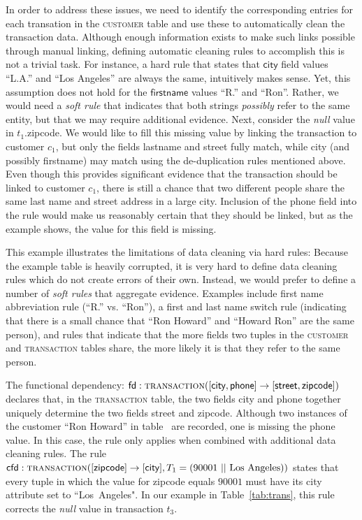 In order to address these issues, we need to identify the corresponding entries for each transation in the \textsc{customer} table and use these to automatically clean the transaction data. Although enough information exists to make such links possible through manual linking, defining automatic cleaning rules to accomplish this is not a trivial task. For instance, a hard rule that states that $\textsf{city}$ field values ``L.A.'' and ``Los Angeles'' are always the same, intuitively makes sense. Yet, this assumption does not hold for the $\textsf{firstname}$ values ``R.'' and ``Ron''. Rather, we would need a \emph{soft rule} that indicates that both strings \emph{possibly} refer to the same entity, but that we may require additional evidence. Next, consider the \emph{null} value in $t_1.$\textsf{zipcode}. We would like to fill this missing value by linking the transaction to customer $c_1$, but only the fields \textsf{lastname} and \textsf{street} fully match, while \textsf{city} (and possibly \textsf{firstname}) may match using the de-duplication rules mentioned above. Even though this provides significant evidence that the transaction should be linked to customer $c_1$, there is still a chance that two different people share the same last name and street address in a large city. Inclusion of the \textsf{phone} field into the rule would make us reasonably certain that they should be linked, but as the example shows, the value for this field is missing. 

This example illustrates the limitations of data cleaning via hard rules: Because the example table is heavily corrupted, it is very hard to define data cleaning rules which do not create errors of their own. Instead, we would prefer to define a number of \emph{soft rules} that aggregate evidence. Examples include first name abbreviation rule (``R.'' vs. ``Ron''), a first and last name switch rule (indicating that there is a small chance that ``Ron Howard'' and ``Howard Ron'' are the same person), and rules that indicate that the more fields two tuples in the \textsc{customer} and \textsc{transaction} tables share, the more likely it is that they refer to the same person. 

The functional dependency: $\textsf{fd}: \textsc{transaction}([\textsf{city}, \textsf{phone}] \rightarrow [\textsf{street}, \textsf{zipcode}])$ declares that, in the \textsc{transaction} table, the two fields \textsf{city} and \textsf{phone} together 
uniquely determine the two fields \textsf{street} and \textsf{zipcode}. Although two instances of the customer ``Ron Howard'' in table~ are recorded, one is missing the \textsf{phone} value. In this case, the rule only applies when combined with additional data cleaning rules. The rule $\textsf{cfd}: \textsc{transaction}([\textsf{zipcode}] \rightarrow [\textsf{city}], T_1 =(90001~||~\text{Los~Angeles}))$ states that every tuple in which the value for \textsf{zipcode} equals $90001$ must have its \textsf{city} attribute set to ``Los~Angeles". In our example in Table~\ref{tab:trans}, this rule corrects the \emph{null} value in transaction $t_3$. 

